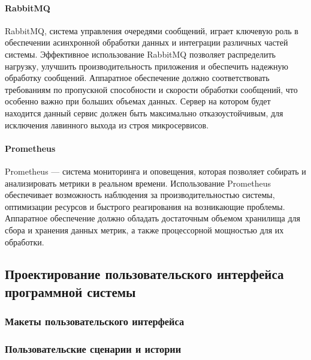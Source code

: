 \paragraph{RabbitMQ}

RabbitMQ, система управления очередями сообщений, играет ключевую роль в обеспечении асинхронной обработки данных и интеграции различных частей системы. Эффективное использование RabbitMQ позволяет распределить нагрузку, улучшить производительность приложения и обеспечить надежную обработку сообщений. Аппаратное обеспечение должно соответствовать требованиям по пропускной способности и скорости обработки сообщений, что особенно важно при больших объемах данных. Сервер на котором будет находится данный сервис должен быть максимально отказоустойчивым, для исключения лавинного выхода из строя микросервисов.

\paragraph{Prometheus}

Prometheus — система мониторинга и оповещения, которая позволяет собирать и анализировать метрики в реальном времени. Использование Prometheus обеспечивает возможность наблюдения за производительностью системы, оптимизации ресурсов и быстрого реагирования на возникающие проблемы. Аппаратное обеспечение должно обладать достаточным объемом хранилища для сбора и хранения данных метрик, а также процессорной мощностью для их обработки.

\subsection{Проектирование пользовательского интерфейса программной системы}
\subsubsection{Макеты пользовательского интерфейса}



\subsubsection{Пользовательские сценарии и истории}




